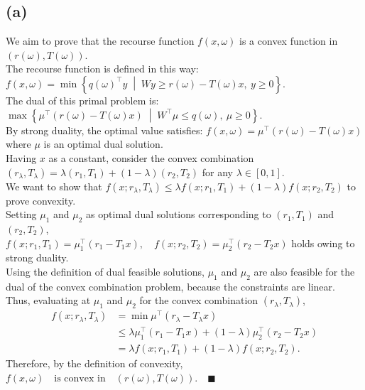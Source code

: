 \documentclass[8pt]{article}
\begin{document}
\subsection*{(a)}
We aim to prove that the recourse function $f(x, \omega)$ is a convex function in $(r(\omega), T(\omega))$. \\ [0.3em]
The recourse function is defined in this way: 
$f(x, \omega) = \min \left\{ q(\omega)^\top y \;\middle|\; Wy \geq r(\omega) - T(\omega)x, \ y \geq 0 \right\}.$\\ [0.3em]
The dual of this primal problem is: 
$\max \left\{ \mu^\top (r(\omega) - T(\omega)x) \;\middle|\; W^\top \mu \leq q(\omega),\ \mu \geq 0 \right\}.$\\ [0.3em]
By strong duality, the optimal value satisfies: $f(x, \omega) = \mu^\top (r(\omega) - T(\omega)x)$ where \(\mu\) is an optimal dual solution. \\ [0.3em]
Having $x$ as a constant, consider the convex combination $(r_\lambda, T_\lambda) = \lambda (r_1, T_1) + (1-\lambda)(r_2, T_2)$ for any \(\lambda \in [0,1]\). \\ [0.3em]
We want to show that $ f(x; r_\lambda, T_\lambda) \leq \lambda f(x; r_1, T_1) + (1-\lambda) f(x; r_2, T_2)$ to prove convexity. \\ [0.3em]
Setting \(\mu_1\) and \(\mu_2\) as optimal dual solutions corresponding to \((r_1, T_1)\) and \((r_2, T_2)\), \\[0.3em]
$f(x; r_1, T_1) = \mu_1^\top (r_1 - T_1x), \quad f(x; r_2, T_2) = \mu_2^\top (r_2 - T_2x)$ holds owing to strong duality. \\ [0.3em]
Using the definition of dual feasible solutions, \(\mu_1\) and \(\mu_2\) are also feasible for the dual of the convex combination problem, because the constraints are linear. \\ [0.3em]
Thus, evaluating at \(\mu_1\) and \(\mu_2\) for the convex combination \((r_\lambda, T_\lambda)\),
$$
\begin{aligned}
f(x; r_\lambda, T_\lambda) 
&= \min \mu^\top (r_\lambda - T_\lambda x) \\
&\leq \lambda \mu_1^\top (r_1 - T_1x) + (1-\lambda) \mu_2^\top (r_2 - T_2x) \\
&= \lambda f(x; r_1, T_1) + (1-\lambda) f(x; r_2, T_2).
\end{aligned}
$$
Therefore, by the definition of convexity,
$
f(x, \omega) \quad \text{is convex in} \quad (r(\omega), T(\omega)).
\quad \blacksquare
$
\end{document}

